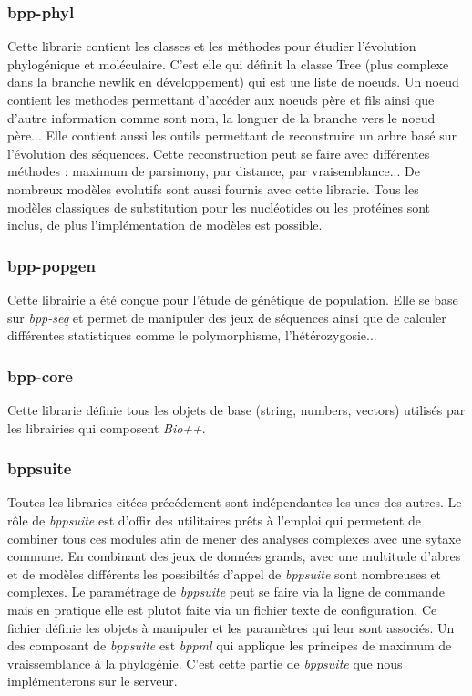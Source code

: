 	\subsubsection*{bpp-phyl}
	Cette librarie contient les classes et les méthodes pour étudier l'évolution phylogénique et moléculaire. C'est elle qui définit la classe Tree (plus complexe dans la branche newlik en développement) qui est une liste de noeuds. Un noeud contient les methodes permettant d'accéder aux noeuds père et fils ainsi que d'autre information comme sont nom, la longuer de la branche vers le noeud père...
	Elle contient aussi les outils permettant de reconstruire un arbre basé sur l'évolution des séquences. Cette reconstruction peut se faire avec différentes méthodes : maximum de parsimony, par distance, par vraisemblance...
	De nombreux modèles evolutifs sont aussi fournis avec cette librarie. Tous les modèles classiques de substitution pour les nucléotides ou les protéines sont inclus, de plus l'implémentation de modèles est possible.
	\subsubsection*{bpp-popgen}
	Cette librairie a été conçue pour l'étude de génétique de population. Elle se base sur \textit{bpp-seq} et permet de manipuler des jeux de séquences ainsi que de calculer différentes statistiques comme le polymorphisme, l'hétérozygosie...
	
	\subsubsection*{bpp-core}
	Cette librarie définie tous les objets de base (string, numbers, vectors) utilisés par les librairies qui composent \textit{Bio++}.
	
	\subsubsection*{bppsuite}
	Toutes les libraries citées précédement sont indépendantes les unes des autres. Le rôle de \textit{bppsuite} est d'offir des utilitaires prêts à l'emploi qui permetent de combiner tous ces modules afin de mener des analyses complexes avec une sytaxe commune. En combinant des jeux de données grands, avec une multitude d'abres et de modèles différents les possibiltés d'appel de \textit{bppsuite} sont nombreuses et complexes. Le paramétrage de \textit{bppsuite} peut se faire via la ligne de commande mais en pratique elle est plutot faite via un fichier texte de configuration. Ce fichier définie les objets à manipuler et les paramètres qui leur sont associés.
	Un des composant de \textit{bppsuite} est \textit{bppml} qui applique les principes de maximum de vraissemblance à la phylogénie. C'est cette partie de \textit{bppsuite} que nous implémenterons sur le serveur.
	
